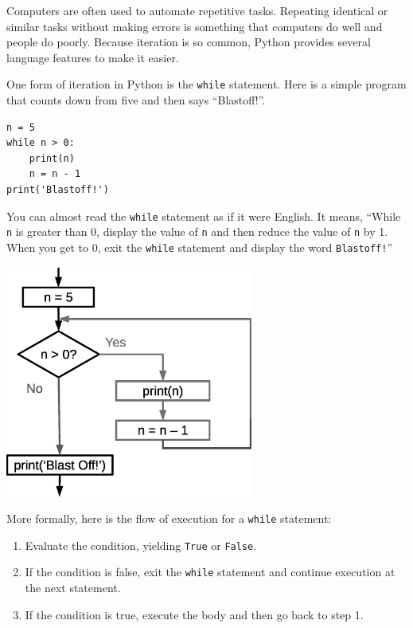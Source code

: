 Computers are often used to automate repetitive tasks.  Repeating
identical or similar tasks without making errors is something that
computers do well and people do poorly.
Because iteration is so common, Python provides several
language features to make it easier.  

One form of iteration in Python is the {\tt while} statement.  Here is 
a simple program that counts down from five and then says ``Blastoff!''.

\beforeverb
\begin{verbatim}
n = 5
while n > 0:
    print(n)
    n = n - 1
print('Blastoff!')
\end{verbatim}
\afterverb
%
You can almost read the {\tt while} statement as if it were English.
It means, ``While {\tt n} is greater than 0,
display the value of {\tt n} and then reduce the value of
{\tt n} by 1.  When you get to 0, exit the {\tt while} statement and
display the word {\tt Blastoff!}''

\beforefig
\centerline{\includegraphics[height=3in]{figs2/while.eps}}
\afterfig


More formally, here is the flow of execution for a {\tt while} statement:

\begin{enumerate}

\item Evaluate the condition, yielding {\tt True} or {\tt False}.

\item If the condition is false, exit the {\tt while} statement
and continue execution at the next statement.

\item If the condition is true, execute the
body and then go back to step 1.

\end{enumerate}


